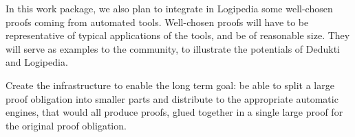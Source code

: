 \begin{workpackage}[id=atpetc,wphases=0-48,type=RTD,
  short=ATPs etc.,%
  title={ATP, SAT, SMT, Model checkers},
  lead=Lie,
  LieRM=10]
\begin{wpdescription}
In this work package, we also plan to integrate in Logipedia some
well-chosen proofs coming from automated tools.  Well-chosen proofs
will have to be representative of typical applications of the tools,
and be of reasonable size.  They will serve as examples to the
community, to illustrate the potentials of Dedukti and Logipedia.


Create the infrastructure to enable the long term goal: be able to split a large proof
obligation into smaller parts and distribute to the appropriate automatic engines, that
would all produce proofs, glued together in a single large proof for the original proof
obligation.
\end{wpdescription}

\begin{tasklist}
  \begin{task}[id=tools,title=Automatic Tools Exporting Proofs]
  \end{task}

  \begin{task}[id=challenges,title=Logipedia as a Source of Challenges for Automatic Reasoners]
  \end{task}
  \begin{task}[id=commang,title=Cooperation of Reasoners via Dedukti/Logipedia]

    
  \end{task}
  \begin{task}[id=database,title=A Database of Theorems for Automatic Solvers]


\end{task}
\end{tasklist}
\end{workpackage}
